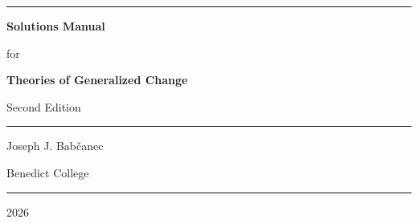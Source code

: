 \documentclass[12pt, oneside]{book}
\begin{document}
\hypersetup{pageanchor=false}

\begin{titlepage}
    \centering
    \vspace*{1.5cm}

    {\color{coverblue}\rule{\textwidth}{2pt}}

    \vspace{1.5cm}

    {\Huge\bfseries\color{coverblue} Solutions Manual \par}

    \vspace{0.8cm}

    {\Large for \par}

    \vspace{0.8cm}

    {\LARGE\bfseries\color{coverblue} Theories of Generalized Change \par}

    \vspace{0.4cm}

    {\large Second Edition \par}

    \vspace{1.5cm}

    {\color{coverblue}\rule{\textwidth}{2pt}}

    \vspace{2cm}

    {\Large Joseph J. Bab\v{c}anec \par}

    \vspace{0.5cm}

    {\large Benedict College \par}

    \vfill

    {\color{covergold}\rule{0.4\textwidth}{1pt}}

    \vspace{0.5cm}

    {\large 2026 \par}

    \vspace{1cm}
\end{titlepage}

\newpage
\thispagestyle{empty}
\vspace*{4cm}
\end{document}
